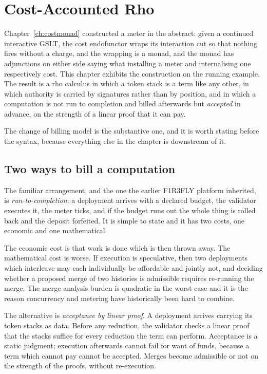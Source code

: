 \chapter{Cost-Accounted Rho}
\label{ch:carho}

Chapter~\ref{ch:costmonad} constructed a meter in the abstract: given a
continued interactive GSLT, the cost endofunctor wraps its interaction cut
so that nothing fires without a charge, and the wrapping is a monad, and
the monad has adjunctions on either side saying what installing a meter
and internalising one respectively cost.
This chapter exhibits the construction on the running example.
The result is a rho calculus in which a token stack is a term like any
other, in which authority is carried by signatures rather than by
position, and in which a computation is not run to completion and billed
afterwards but \emph{accepted} in advance, on the strength of a linear
proof that it can pay.

The change of billing model is the substantive one, and it is worth
stating before the syntax, because everything else in the chapter is
downstream of it.

\section{Two ways to bill a computation}

The familiar arrangement, and the one the earlier F1R3FLY platform
inherited, is \emph{run-to-completion}: a deployment arrives with a
declared budget, the validator executes it, the meter ticks, and if the
budget runs out the whole thing is rolled back and the deposit
forfeited.
It is simple to state and it has two costs, one economic and one
mathematical.

The economic cost is that work is done which is then thrown away.
The mathematical cost is worse.
If execution is speculative, then two deployments which interleave may
each individually be affordable and jointly not, and deciding whether
a proposed merge of two histories is admissible requires re-running the
merge.
The merge analysis burden is quadratic in the worst case and it is the
reason concurrency and metering have historically been hard to combine.

The alternative is \emph{acceptance by linear proof}.
A deployment arrives carrying its token stacks as data.
Before any reduction, the validator checks a linear proof that the stacks
suffice for every reduction the term can perform.
Acceptance is a static judgment; execution afterwards cannot fail for
want of funds, because a term which cannot pay cannot be accepted.
Merges become admissible or not on the strength of the proofs, without
re-execution.

